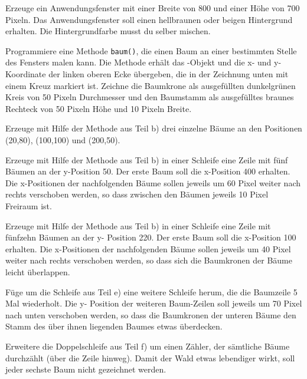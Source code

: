\begin{compactenum}[a)]
\item Erzeuge ein Anwendungsfenster mit einer Breite von 800 und einer Höhe von
700 Pixeln. Das Anwendungsfenster soll einen hellbraunen oder beigen
Hintergrund erhalten. Die Hintergrundfarbe musst du selber mischen.
\item Programmiere eine Methode \lstinline|baum()|, die einen Baum an einer
bestimmten Stelle des Fensters malen kann. Die Methode erhält das
-Objekt und die x- und y-Koordinate der linken oberen Ecke
übergeben, die in der Zeichnung unten mit einem Kreuz markiert ist. Zeichne die
Baumkrone als ausgefüllten dunkelgrünen Kreis von 50 Pixeln Durchmesser und den
Baumstamm als ausgefülltes braunes Rechteck von 50 Pixeln Höhe und 10 Pixeln
Breite.
\item Erzeuge mit Hilfe der Methode aus Teil b) drei einzelne Bäume an den
 Positionen (20,80), (100,100) und (200,50).
\item Erzeuge mit Hilfe der Methode aus Teil b) in einer Schleife eine Zeile mit
fünf Bäumen an der y-Position 50. Der erste Baum soll die x-Position 400
erhalten. Die x-Positionen der nachfolgenden Bäume sollen jeweils um 60 Pixel
weiter nach rechts verschoben werden, so dass zwischen den Bäumen jeweils 10
Pixel Freiraum ist.
\item Erzeuge mit Hilfe der Methode aus Teil b) in einer Schleife eine Zeile mit
fünfzehn Bäumen an der y- Position 220. Der erste Baum soll die x-Position 100
erhalten. Die x-Positionen der nachfolgenden Bäume sollen jeweils um 40 Pixel
weiter nach rechts verschoben werden, so dass sich die Baumkronen der Bäume
leicht überlappen.
\item Füge um die Schleife aus Teil e) eine weitere Schleife herum, die die
Baumzeile 5 Mal wiederholt. Die y- Position der weiteren Baum-Zeilen soll
jeweils um 70 Pixel nach unten verschoben werden, so dass die Baumkronen der
unteren Bäume den Stamm des über ihnen liegenden Baumes etwas überdecken.
\item Erweitere die Doppelschleife aus Teil f) um einen Zähler, der sämtliche
Bäume durchzählt (über die Zeile hinweg). Damit der Wald etwas lebendiger
wirkt, soll jeder sechste Baum nicht gezeichnet werden.
\end{compactenum}

